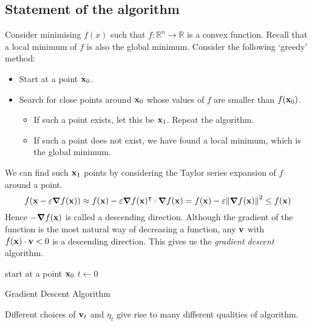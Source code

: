 \subsection{Statement of the algorithm}
Consider minimising \(f(x)\) such that \(f \colon \mathbb R^n \to \mathbb R\) is a convex function.
Recall that a local minimum of \(f\) is also the global minimum.
Consider the following `greedy' method:
\begin{itemize}
	\item Start at a point \(\vb x_0\).
	\item Search for close points around \(\vb x_0\) whose values of \(f\) are smaller than \(f(\vb x_0)\).
	      \begin{itemize}
		      \item If such a point exists, let this be \(\vb x_1\).
		            Repeat the algorithm.
		      \item If such a point does not exist, we have found a local minimum, which is the global minimum.
	      \end{itemize}
\end{itemize}
We can find such \(\vb x_1\) points by considering the Taylor series expansion of \(f\) around a point.
\[
	f(\vb x - \varepsilon\grad{f(\vb x)}) \approx f(\vb x) - \varepsilon \grad{f(\vb x)}^\intercal \cdot \grad{f(\vb x)} = f(\vb x) - \varepsilon\norm{\grad{f(\vb x)}}^2 \leq f(\vb x)
\]
Hence \(-\grad{f(\vb x)}\) is called a descending direction.
Although the gradient of the function is the most natural way of decreasing a function, any \(\vb v\) with \(f(\vb x) \cdot \vb v < 0\) is a descending direction.
This gives us the \textit{gradient descent} algorithm.

\begin{algorithm*}[H]
	\SetAlgoLined{}
	start at a point \(\vb x_0\)\;
	\(t \leftarrow 0\)\;
	\caption{Gradient Descent Algorithm}
\end{algorithm*}

\noindent Different choices of \(\vb v_t\) and \(\eta_t\) give rise to many different qualities of algorithm.

